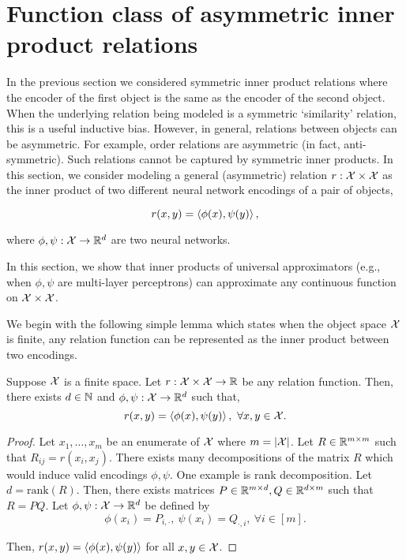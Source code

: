 \section{Function class of asymmetric inner product relations}\label{sec:asymmetric_relations}

In the previous section we considered symmetric inner product relations where the encoder of the first object is the same as the encoder of the second object. When the underlying relation being modeled is a symmetric `similarity' relation, this is a useful inductive bias. However, in general, relations between objects can be asymmetric. For example, order relations are asymmetric (in fact, anti-symmetric). Such relations cannot be captured by symmetric inner products. In this section, we consider modeling a general (asymmetric) relation $r: {\mathcal{X}} \times {\mathcal{X}}$ as the inner product of two different neural network encodings of a pair of objects,


\begin{equation}\label{eq:asymmetric_iprod_relation}
    r(x, y) = \left \langle \phi(x), \psi(y) \right\rangle,
\end{equation}

\noindent where $\phi, \psi: {\mathcal{X}} \to \mathbb{R}^d$ are two neural networks.

In this section, we show that inner products of universal approximators (e.g., when $\phi, \psi$ are multi-layer perceptrons) can approximate any continuous function on ${\mathcal{X}} \times {\mathcal{X}}$.

We begin with the following simple lemma which states when the object space ${\mathcal{X}}$ is finite, any relation function can be represented as the inner product between two encodings.

\begin{lemma}\label{lemma:finite_space_rel}
    Suppose ${\mathcal{X}}$ is a finite space. Let $r: {\mathcal{X}} \times {\mathcal{X}} \to \mathbb{R}$ be any relation function. Then, there exists $d \in {\mathbb{N}}$ and $\phi, \psi : {\mathcal{X}} \to \mathbb{R}^{d}$ such that,
    \begin{equation*}
        r(x, y) = \left \langle \phi(x), \psi(y) \right\rangle, \ \forall x, y \in {\mathcal{X}}.
    \end{equation*}
\end{lemma}

\begin{proof}
    \hphantom{~}

    Let $x_1, \ldots, x_m$ be an enumerate of ${\mathcal{X}}$ where $m = \left\lvert{\mathcal{X}}\right\rvert$. Let $R \in \mathbb{R}^{m \times m}$ such that $R_{ij} = r(x_i, x_j)$. There exists many decompositions of the matrix $R$ which would induce valid encodings $\phi, \psi$. One example is rank decomposition. Let $d = \mathrm{rank}(R)$. Then, there exists matrices $P \in \mathbb{R}^{m \times d}, Q \in \mathbb{R}^{d \times m}$ such that $R = P Q$. Let $\phi, \psi: {\mathcal{X}} \to \mathbb{R}^{d}$ be defined by
    \begin{equation}
        \phi(x_i) = P_{i, \cdot}, \ \psi(x_i) = Q_{\cdot, i}, \ \forall i \in [m].
    \end{equation}

    Then, $r(x, y) = \left \langle \phi(x), \psi(y) \right\rangle$ for all $x, y \in {\mathcal{X}}$.
\end{proof}


